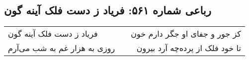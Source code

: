 \begin{center}
\section*{رباعی شماره ۵۶۱: فریاد ز دست فلک آینه گون}
\label{sec:sh561}
\begin{longtable}{l p{0.5cm} r}
فریاد ز دست فلک آینه گون
&&
کز جور و جفای او جگر دارم خون
\\
روزی به هزار غم به شب می‌آرم
&&
تا خود فلک از پرده‌چه آرد بیرون
\\
\end{longtable}
\end{center}
